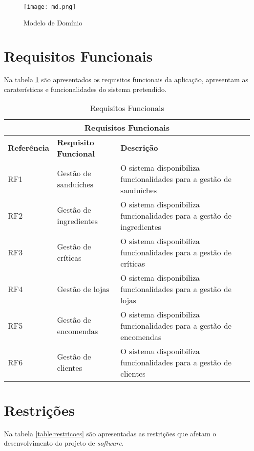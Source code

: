 \begin{figure}[H]
    \texttt{[image: md.png]}
    \caption{Modelo de Domínio}
    \label{fig:md}
\end{figure}


\section{Requisitos Funcionais}

Na tabela \ref{table:reqF} são apresentados os requisitos funcionais da aplicação, apresentam as caraterísticas e funcionalidades do sistema pretendido.
\begin{table}[H]
\caption{Requisitos Funcionais}
\label{table:reqF}
\begin{center}
\begin{tabular}{ |p{2cm}|p{4cm}|p{6cm}|  }
\hline
\multicolumn{3}{|c|}{Requisitos Funcionais} \\
\hline
\textbf{Referência} & \textbf{Requisito Funcional} & \textbf{Descrição} \\
\hline
RF1 & Gestão de sanduíches & O sistema disponibiliza  funcionalidades para a gestão de sanduíches \\
\hline
RF2 & Gestão de ingredientes & O sistema disponibiliza  funcionalidades para a gestão de ingredientes\\
\hline
RF3 & Gestão de críticas & O sistema disponibiliza  funcionalidades para a gestão de críticas\\
\hline
RF4 & Gestão de lojas & O sistema disponibiliza  funcionalidades para a gestão de lojas\\
\hline
RF5 & Gestão de encomendas & O sistema disponibiliza  funcionalidades para a gestão de encomendas\\
\hline
RF6 & Gestão de clientes & O sistema disponibiliza  funcionalidades para a gestão de clientes\\
\hline
\end{tabular} 
\end{center}
\end{table}


\section{Restrições}

Na tabela \ref{table:restricoes} são apresentadas as restrições que afetam o desenvolvimento do projeto de \textit{software}.

